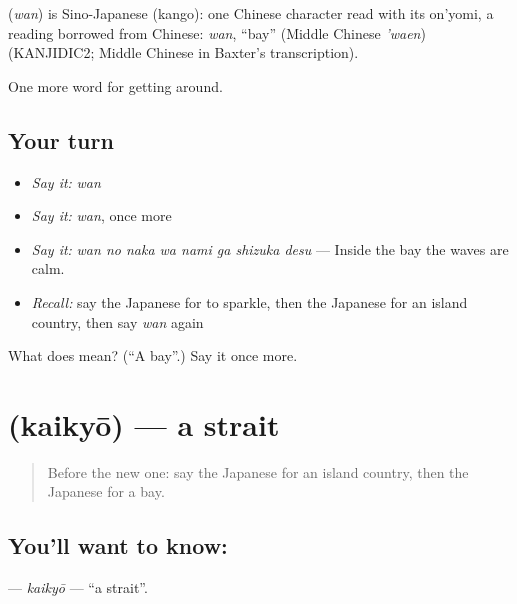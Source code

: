 \begin{cousinweb}
\textbf{} (\emph{wan}) is Sino-Japanese (kango): one Chinese character read with its on'yomi, a reading borrowed from Chinese: \emph{wan}, \textquotedblleft{}bay\textquotedblright{} (Middle Chinese \emph{'waen}) (KANJIDIC2; Middle Chinese in Baxter's transcription).
\end{cousinweb}

\begin{grammarlens}[title={What you've built}]
One more word for getting around.
\end{grammarlens}

\subsection*{Your turn}
\begin{itemize}
\raggedright
  \item \emph{Say it:} \emph{wan}
  \item \emph{Say it:} \emph{wan}, once more
  \item \emph{Say it:} \emph{wan no naka wa nami ga shizuka desu} — Inside the bay the waves are calm.
  \item \emph{Recall:} say the Japanese for to sparkle, then the Japanese for an island country, then say \emph{wan} again
\end{itemize}

\begin{tcolorbox}[breakable,colback=teal!4,colframe=teal!35!black,title={Before you move on}]
What does  mean? (\textquotedblleft{}A bay\textquotedblright{}.) Say it once more.
\end{tcolorbox}
\section[\texorpdfstring{\ja{かいきょう} (kaikyō)}{かいきょう (kaikyō)}]{ (kaikyō) — a strait}

\label{lesson:JA-C383-kaikyou}



\begin{quote}
Before the new one: say the Japanese for an island country, then the Japanese for a bay.
\end{quote}

\subsection*{You'll want to know: }
\textbf{} — \emph{kaikyō} — \textquotedblleft{}a strait\textquotedblright{}.

